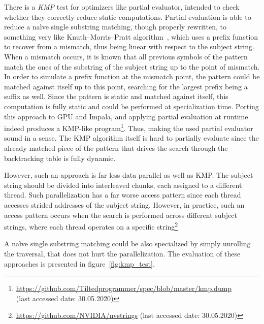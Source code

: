 There is a \emph{KMP} test for optimizers like partial evaluator, intended to check whether they correctly reduce static computations. 
Partial evaluation is able to reduce a na\`ive single substring matching, though properly rewritten, to something very like Knuth--Morris--Pratt algorithm~\cite{KMP-Danvy}, which uses a prefix function to recover from a mismatch, thus being linear with respect to the subject string.
When a mismatch occurs, it is known that all previous symbols of the pattern match the ones of the substring of the subject string up to the point of mismatch. 
In order to simulate a prefix function at the mismatch point, the pattern could be matched against itself up to this point, searching for the largest prefix being a suffix as well.
Since the pattern is static and matched against itself, this computation is fully static and could be performed at specialization time.
Porting this approach to GPU and Impala, and applying partial evaluation at runtime indeed produces a KMP-like program\footnote{\url{https://github.com/Tiltedprogrammer/spec/blob/master/kmp.dump}\\ (last accessed date: 30.05.2020)}. Thus, making the used partial evaluator sound in a sense. The KMP algorithm itself is hard to partially evaluate since the already matched piece of the pattern that drives the search through the backtracking table is fully dynamic.

However, such an approach is far less data parallel as well as KMP. The subject string should be divided into interleaved chunks, each assigned to a different thread. Such parallelization has a far worse access pattern since each thread accesses strided addresses of the subject string. However, in practice, such an access pattern occurs when the search is performed across different subject strings, where each thread operates on a specific string\footnote{\url{https://github.com/NVIDIA/nvstrings} (last accessed date: 30.05.2020)}

A na\`ive single substring matching could be also specialized by simply unrolling the traversal, that does not hurt the parallelization. The evaluation of these approaches is presented in figure~\ref{fig:kmp_test}.

